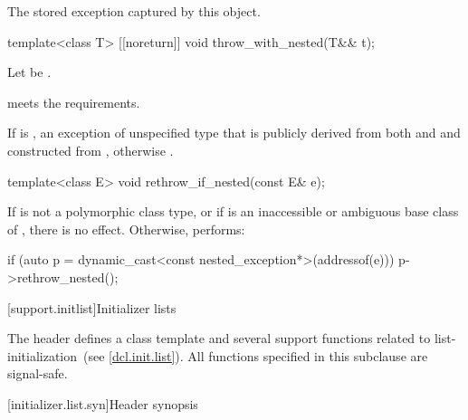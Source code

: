 \begin{itemdescr}
\pnum
\returns
The stored exception captured by this  object.
\end{itemdescr}

%
\begin{itemdecl}
template<class T> [[noreturn]] void throw_with_nested(T&& t);
\end{itemdecl}

\begin{itemdescr}
\pnum
Let  be .

\pnum
\expects
{} meets the  requirements.

\pnum
\throws
If 
is ,
an exception of unspecified type that is publicly derived from both
 and 
and constructed from , otherwise
.
\end{itemdescr}

%
\begin{itemdecl}
template<class E> void rethrow_if_nested(const E& e);
\end{itemdecl}

\begin{itemdescr}
\pnum
\effects
If  is not a polymorphic class type, or
if  is an inaccessible or ambiguous base class of ,
there is no effect.
Otherwise, performs:
\begin{codeblock}
if (auto p = dynamic_cast<const nested_exception*>(addressof(e)))
  p->rethrow_nested();
\end{codeblock}
\end{itemdescr}

[support.initlist]{Initializer lists}

\pnum
The header  defines a class template and several
support functions related to list-initialization~(see \ref{dcl.init.list}).
%
All functions specified in this subclause are signal-safe.

[initializer.list.syn]{Header  synopsis}
%
%
%

